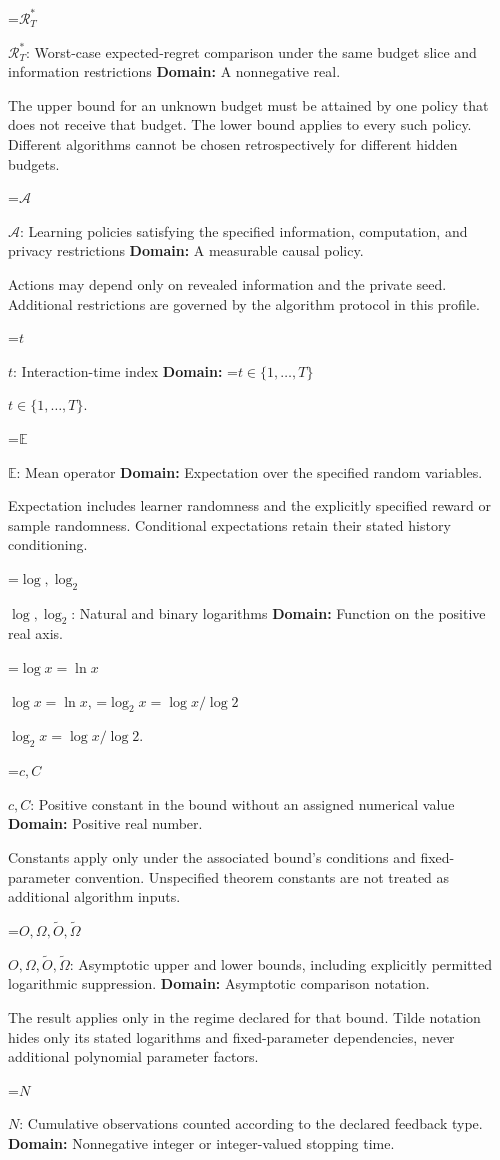 \documentclass[10pt,a4paper]{article}
\newcommand{\AtlasMath}[1]{\par\begingroup\centering\setbox0=\hbox{$\displaystyle #1$}\ifdim\wd0>1.4\linewidth\typeout{ATLAS WIDE FORMULA: \the\wd0}\fi\ifdim\wd0>\linewidth\resizebox{\linewidth}{!}{\box0}\else\box0\fi\par\endgroup}
\newcommand{\AtlasInlineMath}[1]{\begingroup\setbox0=\hbox{$#1$}\ifdim\wd0>.4\linewidth\endgroup\AtlasMath{#1}\else\endgroup$#1$\fi}
\begin{document}
\AtlasInlineMath{\mathcal R_T^*}: Worst-case expected-regret comparison under the same budget slice and information restrictions \textbf{Domain:} A nonnegative real.

The upper bound for an unknown budget must be attained by one policy that does not receive that budget. The lower bound applies to every such policy. Different algorithms cannot be chosen retrospectively for different hidden budgets.

\AtlasInlineMath{\mathcal A}: Learning policies satisfying the specified information, computation, and privacy restrictions \textbf{Domain:} A measurable causal policy.

Actions may depend only on revealed information and the private seed. Additional restrictions are governed by the algorithm protocol in this profile.

\AtlasInlineMath{t}: Interaction-time index \textbf{Domain:} \AtlasInlineMath{t\in\{1,\ldots,T\}}.

\AtlasInlineMath{\mathbb E}: Mean operator \textbf{Domain:} Expectation over the specified random variables.

Expectation includes learner randomness and the explicitly specified reward or sample randomness. Conditional expectations retain their stated history conditioning.

\AtlasInlineMath{\log,\log_2}: Natural and binary logarithms \textbf{Domain:} Function on the positive real axis.

\AtlasInlineMath{\log x=\ln x}, \AtlasInlineMath{\log_2x=\log x/\log2}.

\AtlasInlineMath{c,C}: Positive constant in the bound without an assigned numerical value \textbf{Domain:} Positive real number.

Constants apply only under the associated bound’s conditions and fixed-parameter convention. Unspecified theorem constants are not treated as additional algorithm inputs.

\AtlasInlineMath{O,\Omega,\widetilde O,\widetilde\Omega}: Asymptotic upper and lower bounds, including explicitly permitted logarithmic suppression. \textbf{Domain:} Asymptotic comparison notation.

The result applies only in the regime declared for that bound. Tilde notation hides only its stated logarithms and fixed-parameter dependencies, never additional polynomial parameter factors.

\AtlasInlineMath{N}: Cumulative observations counted according to the declared feedback type. \textbf{Domain:} Nonnegative integer or integer-valued stopping time.
\end{document}
